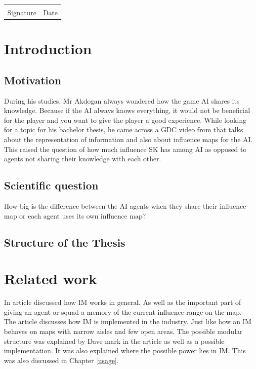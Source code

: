 \documentclass[]{report}
\begin{document}
	\vfill
	\noindent\begin{tabular}{ll}
		\makebox[2.5in]{\hrulefill} & \makebox[2.5in]{\hrulefill}\\
		Signature & Date\\[8ex]
	\end{tabular}
	\newpage
	
	\newpage
	\tableofcontents

	\chapter{Introduction}
	
	\section{Motivation}
During his studies, Mr Akdogan always wondered how the game AI shares its knowledge. Because if the \ac{AI} always knows everything, it would not be beneficial for the player and you want to give the player a good experience. While looking for a topic for his bachelor thesis, he came across a \ac{GDC} video from \citep{knowledgeReprentation} that talks about the representation of information and also about influence maps for the \ac{AI}. This raised the question of how much influence \ac{SK} has among \ac{AI} as opposed to agents not sharing their knowledge with each other.
	
	\section{Scientific question}
	How big is the difference between the \ac{AI} agents when they share their influence map or each agent uses its own influence map? 
	\section{Structure of the Thesis}
	
	\chapter{Related work}
	In \cite{10.5555/2821138} article discussed how \ac{IM} works in general. As well as the important part of giving an agent or squad a memory of the current influence range on the map.\newline \newline
	The article \citep{gameDevInfluenceMap} discusses how \ac{IM} is implemented in the industry. Just like how an \ac{IM} behaves on maps with narrow aisles and few open areas. \newline \newline
	The possible modular structure was explained by Dave mark in the article \citep{gameAIPro} as well as a possible implementation. It was also explained where the possible power lies in \ac{IM}. This was also discussed in Chapter \ref{usage}. 
	
\end{document}
